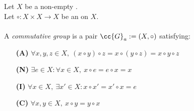 \begin{definition}
    \label{def:commutative_group}
    Let \(X\) be a non-empty .\\
    Let \(\circ: X\times X \to X\) be an  on \(X\). \\\\
    A \textit{commutative group} is a pair \(\cc{G}_a:= (X, \circ)\) satisfying:
    \begin{enumerate}
        \item [\textbf{(A)}] \(\forall x,y,z\in X,\ (x\circ y)\circ z= x\circ (y\circ z) = x\circ y \circ z\)
        \item [\textbf{(N)}] \(\exists e \in X : \forall x \in X,\ x\circ e = e \circ x = x\)
        \item [\textbf{(I)}] \(\forall x \in X,\ \exists x'\in X: x\circ x' = x'\circ x = e\)
        \item [\textbf{(C)}] \(\forall x,y\in X,\ x\circ y = y\circ x\)
    \end{enumerate}
\end{definition}

\begin{definition}[Semiring]
    \label{def:semiring}
\end{definition}

\begin{definition}
    \label{def:commutative_semiring}
\end{definition}

\begin{definition}[Ring]
    \label{def:ring}
\end{definition}

\begin{definition}[Field]
    \label{def:field}
\end{definition}
\begin{definition}
    \label{def:number_field}
\end{definition}

\begin{definition}
    \label{def:fundamental_system}
\end{definition}

\begin{definition}[Unit]
    \label{def:primitive_element}
\end{definition}
\begin{definition}
    \label{def:primitive_root_of_unity}
\end{definition}

